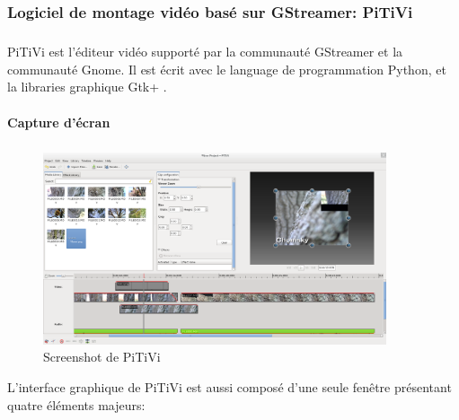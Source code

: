 \subsubsection {Logiciel de montage vidéo basé sur GStreamer: PiTiVi}

\subparagraph{}

PiTiVi est l'éditeur vidéo supporté par la communauté GStreamer et la
communauté Gnome. Il est écrit avec le language de programmation Python,
et la libraries graphique Gtk+ .

\paragraph {Capture d'écran}

\subparagraph{}

\begin{figure}[H]

  \begin{center}

    \includegraphics[width=0.90\textwidth]{images/pitivi}

  \end{center}

  \caption{Screenshot de PiTiVi}

  \label{Yes}

\end{figure}

L'interface graphique de PiTiVi est aussi composé d'une seule fenêtre
présentant quatre éléments majeurs:

